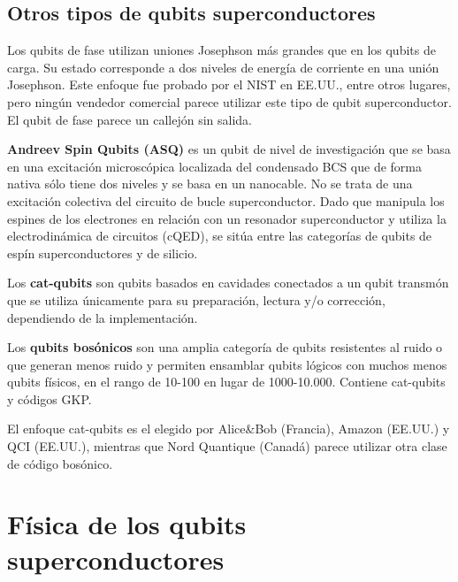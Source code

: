 \subsection{Otros tipos de qubits superconductores} 


Los qubits de fase utilizan uniones Josephson más grandes que en los qubits de carga. Su estado corresponde a dos niveles de energía de corriente en una unión Josephson. Este enfoque fue probado por el NIST en EE.UU., entre otros lugares, pero ningún vendedor comercial parece utilizar este tipo de qubit superconductor. El qubit de fase parece un callejón sin salida.




\textbf{Andreev Spin Qubits (ASQ)} es un qubit de nivel de investigación que se basa en una excitación microscópica localizada del condensado BCS que de forma nativa sólo tiene dos niveles y se basa en un nanocable. No se trata de una excitación colectiva del circuito de bucle superconductor. Dado que manipula los espines de los electrones en relación con un resonador superconductor y utiliza la electrodinámica de circuitos (cQED), se sitúa entre las categorías de qubits de espín superconductores y de silicio.


Los \textbf{cat-qubits} son qubits basados en cavidades conectados a un qubit transmón que se utiliza únicamente para su preparación, lectura y/o corrección, dependiendo de la implementación.


Los \textbf{qubits bosónicos} son una amplia categoría de qubits resistentes al ruido o que generan menos ruido y permiten ensamblar qubits lógicos con muchos menos qubits físicos, en el rango de 10-100 en lugar de 1000-10.000. Contiene cat-qubits y códigos GKP.

El enfoque cat-qubits es el elegido por Alice{\&}Bob (Francia), Amazon (EE.UU.) y QCI (EE.UU.), mientras que Nord Quantique (Canadá) parece utilizar otra clase de código bosónico.




\section{Física de los qubits superconductores} \label{sec_scq_fisica_de_lo_scq}

